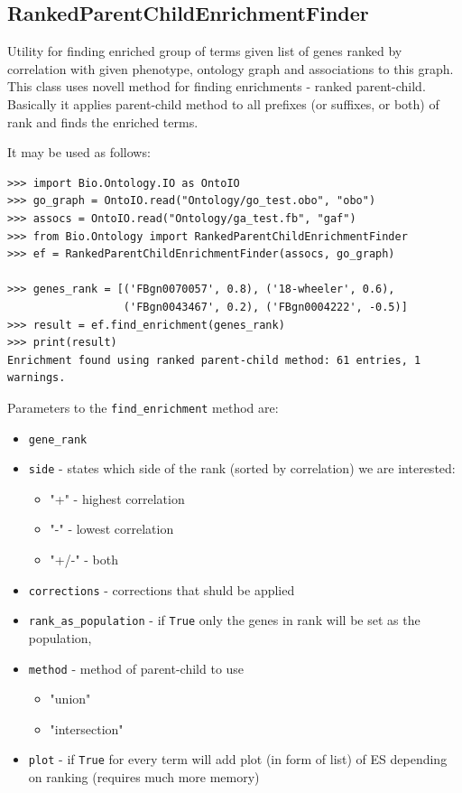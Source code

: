 \documentclass{report}
\begin{document}
\subsection{RankedParentChildEnrichmentFinder}
Utility for finding enriched group of terms given list of genes ranked
by correlation with given phenotype, ontology graph and associations to this graph.
This class uses novell method for finding enrichments -
ranked parent-child. Basically it applies parent-child method
to all prefixes (or suffixes, or both) of rank and finds the
enriched terms.

It may be used as follows:
\begin{verbatim}
>>> import Bio.Ontology.IO as OntoIO
>>> go_graph = OntoIO.read("Ontology/go_test.obo", "obo")
>>> assocs = OntoIO.read("Ontology/ga_test.fb", "gaf")
>>> from Bio.Ontology import RankedParentChildEnrichmentFinder
>>> ef = RankedParentChildEnrichmentFinder(assocs, go_graph)

>>> genes_rank = [('FBgn0070057', 0.8), ('18-wheeler', 0.6),
                  ('FBgn0043467', 0.2), ('FBgn0004222', -0.5)]
>>> result = ef.find_enrichment(genes_rank)
>>> print(result)
Enrichment found using ranked parent-child method: 61 entries, 1 warnings.
\end{verbatim}

Parameters to the \verb|find_enrichment| method are:
\begin{itemize}
\item \verb|gene_rank|
\item \verb|side| - states which side of the rank (sorted by correlation)
we are interested:
\begin{itemize}
\item "+" - highest correlation
\item "-" - lowest correlation
\item "+/-" - both
\end{itemize}
\item \verb|corrections| - corrections that shuld be applied
\item \verb|rank_as_population| - if \verb|True| only the  genes in rank 
will be set as the population,
\item \verb|method| - method of parent-child to use
\begin{itemize}
\item "union"
\item "intersection"
\end{itemize}
\item \verb|plot| - if \verb|True| for every term will add plot (in form of list) 
		of ES depending on ranking (requires much more memory)
\end{itemize}
\end{document}
